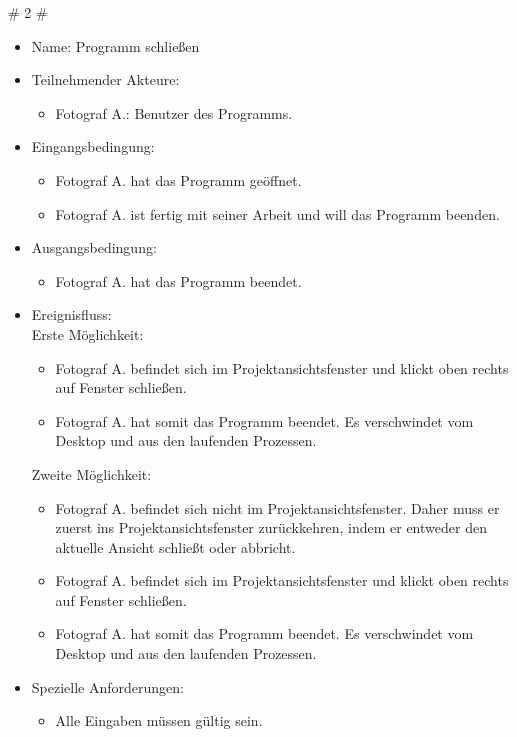 	\# 2 \#
	\begin{itemize}
		\item Name: Programm schließen
		\item Teilnehmender Akteure:
		\begin{itemize}
			\item	Fotograf A.: Benutzer des Programms.
		\end{itemize}
		\item Eingangsbedingung:
		\begin{itemize}
			\item Fotograf A. hat das Programm geöffnet.
			\item Fotograf A. ist fertig mit seiner Arbeit und will das Programm beenden.						
		\end{itemize}
		\item Ausgangsbedingung:
		\begin{itemize}
			\item	Fotograf A. hat das Programm beendet.		
		\end{itemize}
		\item Ereignisfluss:\\Erste Möglichkeit:	
		\begin{itemize}
			\item Fotograf A. befindet sich im Projektansichtsfenster und klickt oben rechts auf Fenster schließen.
			\item Fotograf A. hat somit das Programm beendet. Es verschwindet vom Desktop und aus den laufenden Prozessen.
		\end{itemize}
		Zweite Möglichkeit:
		\begin{itemize}
			\item Fotograf A. befindet sich nicht im Projektansichtsfenster. Daher muss er zuerst ins Projektansichtsfenster zurückkehren, indem er entweder den aktuelle Ansicht schließt oder abbricht.
			\item Fotograf A. befindet sich im Projektansichtsfenster und klickt oben rechts auf Fenster schließen.
			\item Fotograf A. hat somit das Programm beendet. Es verschwindet vom Desktop und aus den laufenden Prozessen.
		\end{itemize}	
		\item Spezielle Anforderungen:
		\begin{itemize}
			\item	Alle Eingaben müssen gültig sein.		
		\end{itemize}
	\end{itemize}
	

